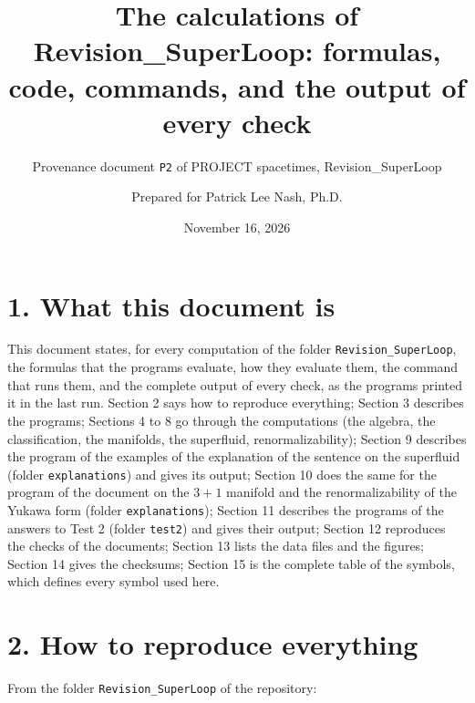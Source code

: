 \documentclass[
  10pt,
]{article}
\title{The calculations of Revision\_SuperLoop: formulas, code,
commands, and the output of every check}
\subtitle{Provenance document \texttt{P2} of PROJECT spacetimes,
Revision\_SuperLoop}
\author{Prepared for Patrick Lee Nash, Ph.D.}
\date{November 16, 2026}
\begin{document}
\maketitle

\hypertarget{what-this-document-is}{%
\section{1. What this document is}\label{what-this-document-is}}

This document states, for every computation of the folder
\texttt{Revision\_SuperLoop}, the formulas that the programs evaluate,
how they evaluate them, the command that runs them, and the complete
output of every check, as the programs printed it in the last run.
Section 2 says how to reproduce everything; Section 3 describes the
programs; Sections 4 to 8 go through the computations (the algebra, the
classification, the manifolds, the superfluid, renormalizability);
Section 9 describes the program of the examples of the explanation of
the sentence on the superfluid (folder \texttt{explanations}) and gives
its output; Section 10 does the same for the program of the document on
the \(3+1\) manifold and the renormalizability of the Yukawa form
(folder \texttt{explanations}); Section 11 describes the programs of the
answers to Test 2 (folder \texttt{test2}) and gives their output;
Section 12 reproduces the checks of the documents; Section 13 lists the
data files and the figures; Section 14 gives the checksums; Section 15
is the complete table of the symbols, which defines every symbol used
here.

\hypertarget{how-to-reproduce-everything}{%
\section{2. How to reproduce
everything}\label{how-to-reproduce-everything}}

From the folder \texttt{Revision\_SuperLoop} of the repository:
\end{document}
